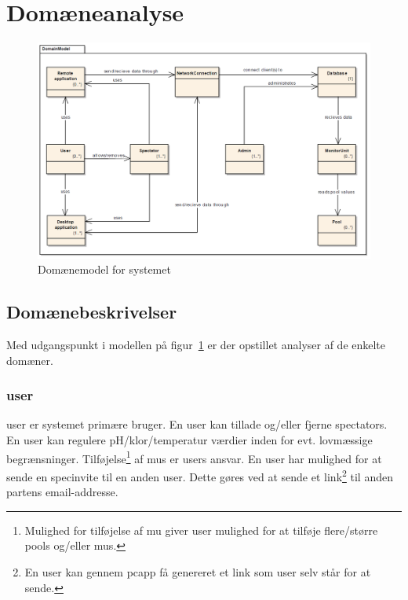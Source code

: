 \section{Domæneanalyse}

\begin{figure}
	\centering
	\includegraphics[width=\linewidth]{figs/domainModel}
	\caption{Domænemodel for systemet}
	\label{fig:domainmodel}
\end{figure}


\subsection{Domænebeskrivelser}
Med udgangspunkt i modellen på figur~\ref{fig:domainmodel} er der opstillet analyser af de enkelte domæner.

\subsubsection{\gls{user}}
\gls{user} er systemet primære bruger. En \gls{user} kan tillade og/eller fjerne \glspl{spectator}. En \gls{user} kan regulere pH/klor/temperatur værdier inden for evt. lovmæssige begrænsninger. Tilføjelse\footnote{Mulighed for tilføjelse af  \gls{mu} giver \gls{user} mulighed for at tilføje flere/større \glspl{pool} og/eller \glspl{mu}.} af \glspl{mu} er \glspl{user} ansvar. En \gls{user} har mulighed for at sende en \gls{specinvite} til en anden \gls{user}. Dette gøres ved at sende et link\footnote{En \gls{user} kan gennem \gls{pcapp} få genereret et link som \gls{user} selv står for at sende.}  til anden partens email-addresse.

